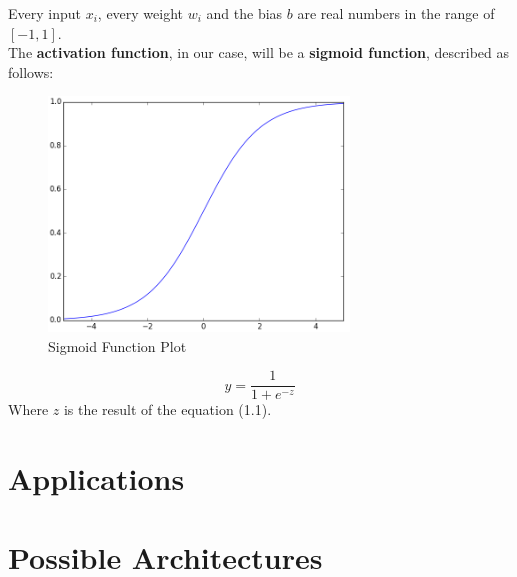 Every input $x_{i}$, every weight $w_{i}$ and the bias $b$ are real numbers in the range of $[-1, 1]$. \\
The \textbf{activation function}, in our case, will be a \textbf{sigmoid function}, described as follows:
\begin{figure}[h]
	\centering
	\caption{Sigmoid Function Plot}
	\includegraphics[width=8cm]{img/sigmoid.png}
\end{figure}
\begin{equation}
	y = \dfrac{1}{1+e^{-z}}
\end{equation}
Where $z$ is the result of the equation (1.1).
\section{Applications}

\section{Possible Architectures}
